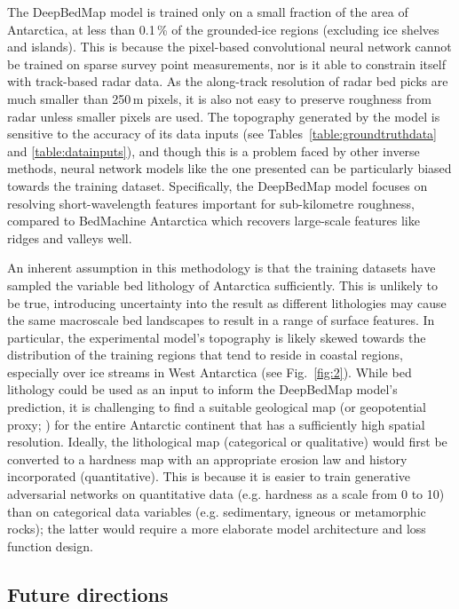 \documentclass[tc, noline]{copernicus}
\begin{document}
The DeepBedMap model is trained only on a small fraction of the area of Antarctica, at less than 0.1\,{\%} of the grounded-ice regions (excluding ice
shelves and islands). This is because the pixel-based convolutional neural network cannot be trained on sparse survey point measurements, nor is it
able to constrain itself with track-based radar data. As the along-track resolution of radar bed picks are much smaller than 250\,\unit{m} pixels,
it is also not easy to preserve roughness from radar unless smaller pixels are used. The topography generated by the model is sensitive to the
accuracy of its data inputs (see Tables~\ref{table:groundtruthdata} and \ref{table:datainputs}), and though this is a problem faced by other inverse
methods, neural network models like the one presented can be particularly biased towards the training dataset. Specifically, the DeepBedMap model
focuses on resolving short-wavelength features important for sub-kilometre roughness, compared to BedMachine Antarctica
\citep{MorlighemDeepglacialtroughs2019} which recovers large-scale features like ridges and valleys well.

An inherent assumption in this methodology is that the training datasets have sampled the variable bed lithology of Antarctica
\citep{CoxGeoMAPdatasetAntarctic2018} sufficiently. This is unlikely to be true, introducing uncertainty into the result as different lithologies may
cause the same macroscale bed landscapes to result in a range of surface features. In particular, the experimental model's topography is likely
skewed towards the distribution of the training regions that tend to reside in coastal regions, especially over ice streams in West Antarctica (see
Fig.~\ref{fig:2}). While bed lithology could be used as an input to inform the DeepBedMap model's prediction, it is challenging to find a suitable
geological map (or geopotential proxy; \citealp[see e.g.][]{AitkensubglacialgeologyWilkes2014,CoxGeoMAPdatasetAntarctic2018}) for the entire Antarctic
continent that has a sufficiently high spatial resolution. Ideally, the lithological map (categorical or qualitative) would first be converted to a
hardness map with an appropriate erosion law and history incorporated (quantitative). This is because it is easier to train generative adversarial
networks on quantitative data (e.g. hardness as a scale from 0 to 10) than on categorical data variables (e.g. sedimentary, igneous or metamorphic
rocks); the latter would require a more elaborate model architecture and loss function design.


\subsection{Future directions}\label{section:futuredirections}
\end{document}
